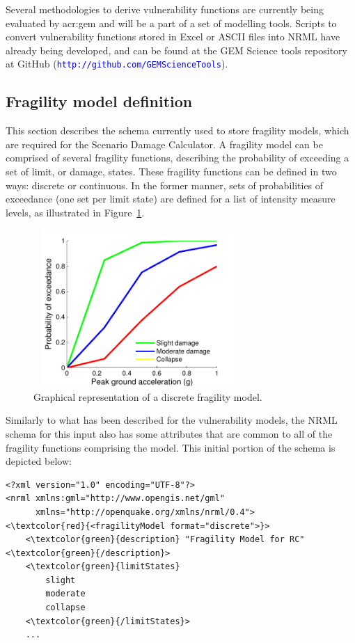 Several methodologies to derive vulnerability functions are currently being evaluated by \gls{acr:gem} and will be a part of a set of modelling tools. Scripts to convert \glspl{vulnerability function} stored in Excel or ASCII files into NRML have already being developed, and can be found at the GEM Science tools repository at GitHub (\textcolor{blue}{\Verb+http://github.com/GEMScienceTools+}).

\subsection{Fragility model definition}
This section describes the schema currently used to store \glspl{fragility model}, which are required for the Scenario Damage Calculator. A \gls{fragility model} can be comprised of several \glspl{fragility function}, describing the probability of exceeding a set of limit, or damage, states. These \glspl{fragility function} can be defined in two ways: discrete or continuous. In the former manner, sets of probabilities of exceedance (one set per limit state) are defined for a list of intensity measure levels, as illustrated in Figure~\ref{fig:fragModelDiscrete}.

\begin{figure}[ht]
\centering
\includegraphics[width=8cm,height=6cm]{figures/risk/DisFragilityModel.pdf}
\caption{Graphical representation of a discrete fragility model.}
\label{fig:fragModelDiscrete}
\end{figure}

Similarly to what has been described for the \glspl{vulnerability model}, the NRML schema for this input also has some attributes that are common to all of the \glspl{fragility function} comprising the model. This initial portion of the schema is depicted below:

\begin{Verbatim}[frame=single, commandchars=\\\{\}, samepage=true]
<?xml version="1.0" encoding="UTF-8"?>
<nrml xmlns:gml="http://www.opengis.net/gml"
      xmlns="http://openquake.org/xmlns/nrml/0.4">
<\textcolor{red}{<fragilityModel format="discrete">}>
    <\textcolor{green}{description} "Fragility Model for RC" <\textcolor{green}{/description}>
    <\textcolor{green}{limitStates}
        slight
        moderate
        collapse
    <\textcolor{green}{/limitStates}>
    ...
\end{Verbatim}

